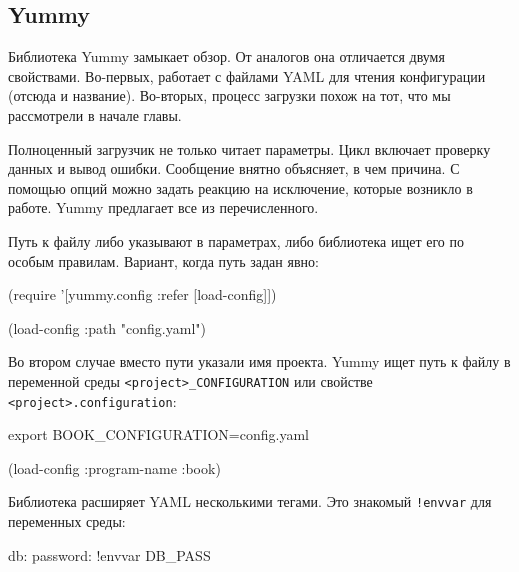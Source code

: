 \subsection{Yummy}


Библиотека Yummy замыкает обзор. От
аналогов она отличается двумя свойствами. Во-первых, работает с файлами YAML для
чтения конфигурации (отсюда и название). Во-вторых, процесс загрузки похож на
тот, что мы рассмотрели в начале главы.

Полноценный загрузчик не только читает параметры. Цикл включает проверку данных
и вывод ошибки. Сообщение внятно объясняет, в чем причина. С помощью опций можно
задать реакцию на исключение, которые возникло в работе. Yummy предлагает все из
перечисленного.

Путь к файлу либо указывают в параметрах, либо библиотека ищет его по особым
правилам. Вариант, когда путь задан явно:

\begin{english}
  \begin{clojure}
(require '[yummy.config :refer [load-config]])

(load-config {:path "config.yaml"})
  \end{clojure}
\end{english}

Во втором случае вместо пути указали имя проекта. Yummy ищет путь к файлу в
переменной среды \verb|<project>_CONFIGURATION| или свойстве
\verb|<project>.configuration|:

\begin{english}
  \begin{bash}
export BOOK_CONFIGURATION=config.yaml
  \end{bash}
\end{english}

\begin{english}
  \begin{clojure}
(load-config {:program-name :book})
  \end{clojure}
\end{english}

Библиотека расширяет YAML несколькими тегами. Это знакомый \verb|!envvar|
для переменных среды:


\begin{english}
  \begin{yaml}
db:
  password: !envvar DB_PASS
  \end{yaml}
\end{english}

